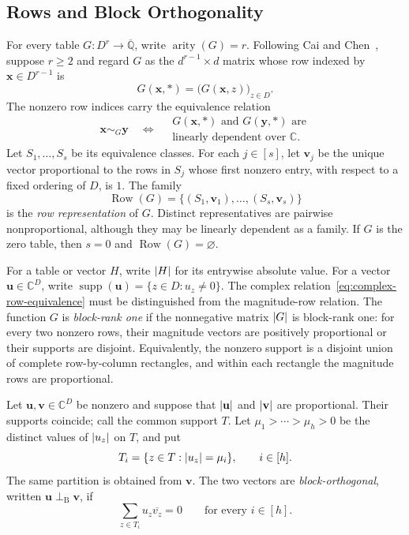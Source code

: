 \documentclass[11pt]{article}
\theoremstyle{plain}
\theoremstyle{definition}
\theoremstyle{remark}
\newcommand{\AlgNums}{\overline{\mathbb Q}}
\DeclareMathOperator{\arity}{arity}
\DeclareMathOperator{\supp}{supp}
\DeclareMathOperator{\Row}{Row}
\DeclarePairedDelimiter{\abs}{\lvert}{\rvert}
\begin{document}
\subsection{Rows and Block Orthogonality}

For every table $G:D^r\to\AlgNums$, write $\arity(G)=r$.  Following Cai and
Chen~\cite[Sections~2.3 and~2.5]{CaiChen2017}, suppose $r\ge2$ and regard
$G$ as the
$d^{r-1}\times d$ matrix whose row indexed by
$\mathbf x\in D^{r-1}$ is
\[
  G(\mathbf x,\ast)=\bigl(G(\mathbf x,z)\bigr)_{z\in D}.
\]
The nonzero row indices carry the equivalence relation
\begin{equation}
  \mathbf x\sim_G\mathbf y
  \quad\Longleftrightarrow\quad
  \begin{gathered}
    G(\mathbf x,\ast)\text{ and }G(\mathbf y,\ast)\text{ are}\\
    \text{linearly dependent over }\mathbb C.
  \end{gathered}
  \label{eq:complex-row-equivalence}
\end{equation}
Let $S_1,\ldots,S_s$ be its equivalence classes.  For each $j\in[s]$,
let $\mathbf v_j$ be the unique vector proportional to the rows in $S_j$
whose first nonzero entry, with respect to a fixed ordering of $D$, is $1$.
The family
\begin{equation*}
  \Row(G)=\{(S_1,\mathbf v_1),\ldots,(S_s,\mathbf v_s)\}
\end{equation*}
is the \emph{row representation} of $G$.  Distinct representatives are
pairwise nonproportional, although they may be linearly dependent as a
family.  If
$G$ is the zero table, then $s=0$ and $\Row(G)=\varnothing$.

For a table or vector $H$, write $\abs H$ for its entrywise absolute value.
For a vector $\mathbf u\in\mathbb C^D$, write
$\supp(\mathbf u)=\{z\in D:u_z\ne0\}$.  The complex
relation~\eqref{eq:complex-row-equivalence} must be distinguished from the
magnitude-row relation.  The function $G$ is \emph{block-rank one} if the
nonnegative matrix $\abs G$ is block-rank one: for every two nonzero rows,
their magnitude vectors are positively proportional or their supports are
disjoint.  Equivalently, the nonzero support is a disjoint union of complete
row-by-column rectangles, and within each rectangle the magnitude rows are
proportional.

Let $\mathbf u,\mathbf v\in\mathbb C^D$ be nonzero and suppose that
$\abs{\mathbf u}$ and $\abs{\mathbf v}$ are proportional.  Their supports
coincide; call the common support $T$.  Let
$\mu_1>\cdots>\mu_h>0$ be the distinct values of $\abs{u_z}$ on $T$, and
put
\[
  T_i=\{z\in T:\abs{u_z}=\mu_i\},\qquad i\in[h].
\]
The same partition is obtained from $\mathbf v$.  The two vectors are
\emph{block-orthogonal}, written
$\mathbf u\perp_{\mathrm B}\mathbf v$, if
\begin{equation}
  \sum_{z\in T_i}u_z\overline{v_z}=0
  \qquad\text{for every }i\in[h].
  \label{eq:vector-block-orthogonality}
\end{equation}
\end{document}
